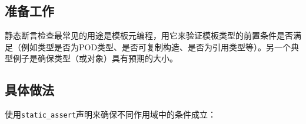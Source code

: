 
\subsection{准备工作}



静态断言检查最常见的用途是模板元编程，用它来验证模板类型的前置条件是否满足（例如类型是否为POD类型、是否可复制构造、是否为引用类型等）。另一个典型例子是确保类型（或对象）具有预期的大小。



\subsection{具体做法}



使用\texttt{static\_\allowbreak{}assert}声明来确保不同作用域中的条件成立：



